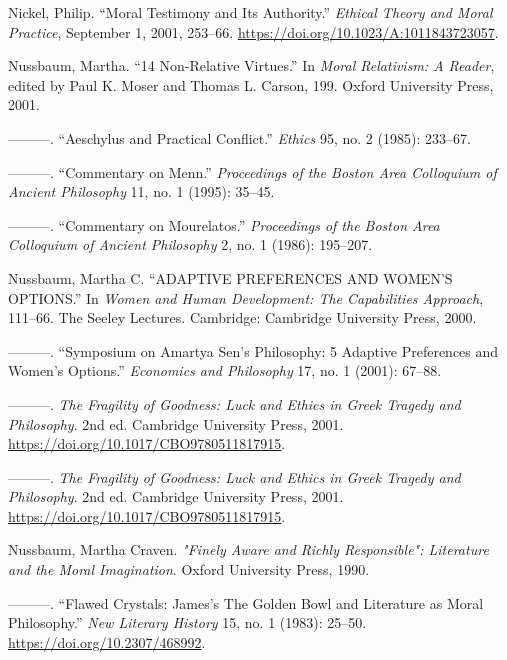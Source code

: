 \documentclass[
  12pt,
]{book}
\newlength{\cslhangindent}
\newenvironment{CSLReferences}[2] %
 {\begin{list}{}{%
  \setlength{\itemindent}{0pt}
  \setlength{\leftmargin}{0pt}
  \setlength{\parsep}{0pt}
  \ifodd #1
   \setlength{\leftmargin}{\cslhangindent}
   \setlength{\itemindent}{-1\cslhangindent}
  \fi
  \setlength{\itemsep}{#2\baselineskip}}}
 {\end{list}}
\theoremstyle{definition}
\theoremstyle{definition}
\theoremstyle{definition}
\theoremstyle{definition}
\theoremstyle{remark}
\begin{document}
\begin{CSLReferences}{1}{0}
Nickel, Philip. {``Moral {Testimony} and Its {Authority}.''} \emph{Ethical Theory and Moral Practice}, September 1, 2001, 253--66. \url{https://doi.org/10.1023/A:1011843723057}.

Nussbaum, Martha. {``14 {Non-Relative Virtues}.''} In \emph{Moral {Relativism}: {A Reader}}, edited by Paul K. Moser and Thomas L. Carson, 199. Oxford University Press, 2001.

---------. {``Aeschylus and Practical Conflict.''} \emph{Ethics} 95, no. 2 (1985): 233--67.

---------. {``Commentary on {Menn}.''} \emph{Proceedings of the Boston Area Colloquium of Ancient Philosophy} 11, no. 1 (1995): 35--45.

---------. {``Commentary on {Mourelatos}.''} \emph{Proceedings of the Boston Area Colloquium of Ancient Philosophy} 2, no. 1 (1986): 195--207.

Nussbaum, Martha C. {``{ADAPTIVE PREFERENCES AND WOMEN}'{S OPTIONS}.''} In \emph{Women and Human Development: {The} Capabilities Approach}, 111--66. The Seeley Lectures. Cambridge: Cambridge University Press, 2000.

---------. {``Symposium on {Amartya Sen}'s Philosophy: 5 Adaptive Preferences and Women's Options.''} \emph{Economics and Philosophy} 17, no. 1 (2001): 67--88.

---------. \emph{The {Fragility} of {Goodness}: {Luck} and {Ethics} in {Greek Tragedy} and {Philosophy}}. 2nd ed. Cambridge University Press, 2001. \url{https://doi.org/10.1017/CBO9780511817915}.

---------. \emph{The {Fragility} of {Goodness}: {Luck} and {Ethics} in {Greek Tragedy} and {Philosophy}}. 2nd ed. Cambridge University Press, 2001. \url{https://doi.org/10.1017/CBO9780511817915}.

Nussbaum, Martha Craven. \emph{"{Finely Aware} and {Richly Responsible}": {Literature} and the {Moral Imagination}}. Oxford University Press, 1990.

---------. {``Flawed {Crystals}: {James}'s {The Golden Bowl} and {Literature} as {Moral Philosophy}.''} \emph{New Literary History} 15, no. 1 (1983): 25--50. \url{https://doi.org/10.2307/468992}.


\end{CSLReferences}
\end{document}
